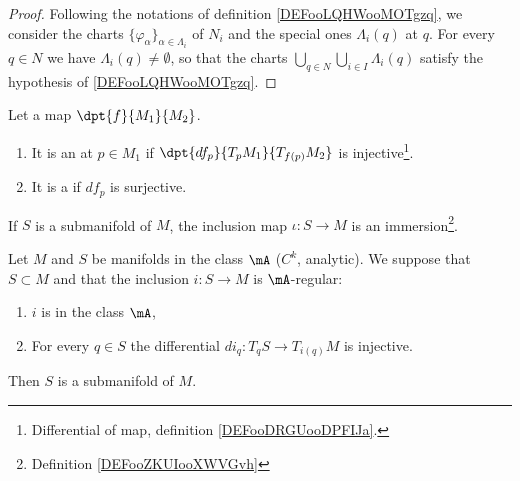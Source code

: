 \begin{proof}
	Following the notations of definition \ref{DEFooLQHWooMOTgzq}, we consider the charts \( \{ \varphi_{\alpha} \}_{\alpha\in\Lambda_i}\) of \( N_i\) and the special ones \( \Lambda_i(q)\) at \( q\). For every \( q\in N\) we have \( \Lambda_i(q)\neq \emptyset\), so that the charts \( \bigcup_{q\in N}\bigcup_{i\in I}\Lambda_i(q)\) satisfy the hypothesis of \ref{DEFooLQHWooMOTgzq}.
\end{proof}

\begin{definition}      \label{DEFooZKUIooXWVGvh}
	Let a map $\dpt{f}{M_1}{M_2}$.
	\begin{enumerate}
		\item
		      It is an  at $p\in M_1$ if $\dpt{df_p}{T_pM_1}{T_{f(p)}M_2}$ is injective\footnote{Differential of map, definition \ref{DEFooDRGUooDPFIJa}.}.
		\item
		      It is a  if $df_p$ is surjective.
	\end{enumerate}
\end{definition}


\begin{proposition}       \label{PROPooEWUCooTStAvb}
	If \( S\) is a submanifold of \( M\), the inclusion map \( \iota\colon S \to M\) is an immersion\footnote{Definition \ref{DEFooZKUIooXWVGvh}}.
\end{proposition}

\begin{proposition}     \label{PROPooZACHooCNgLSl}
	Let \( M\) and \( S\) be manifolds in the class \( \mA\) (\( C^k\), analytic). We suppose that \( S\subset M\) and that the inclusion \(i \colon S\to M  \) is \( \mA\)-regular:
	\begin{enumerate}
		\item
		      \( i\) is in the class \( \mA\),
		\item
		      For every \( q\in S\) the differential \(di_q \colon T_qS\to T_{i(q)}M  \) is injective.
	\end{enumerate}
	Then \( S\) is a submanifold of \( M\).
\end{proposition}

